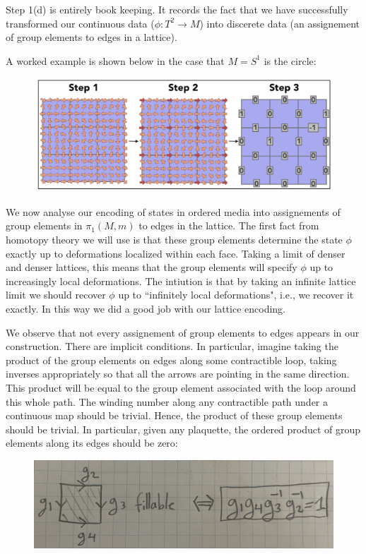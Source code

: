 \documentclass{article}
\theoremstyle{definition}
\newcommand{\0}{\left|0\right>}
\newcommand{\1}{\left|1\right>}
\numberwithin{figure}{section}
\begin{document}
Step 1(d) is entirely book keeping. It records the fact that we have successfully transformed our continuous data ($\phi:T^2\to M$) into discerete data (an assignement of group elements to edges in a lattice).

A worked example is shown below in the case that $M=S^1$ is the circle:

\begin{figure}[h]
\begin{center}
\includegraphics[scale=.3]{full-example}
\end{center}
\end{figure}

We now analyse our encoding of states in ordered media into assignements of group elements in $\pi_1(M,m)$ to edges in the lattice. The first fact from homotopy theory we will use is that these group elements determine the state $\phi$ exactly up to deformations localized within each face. Taking a limit of denser and denser lattices, this means that the group elements will specify $\phi$ up to increasingly local deformations. The intiution is that by taking an infinite lattice limit we should recover $\phi$ up to ``infinitely local deformations", i.e., we recover it exactly. In this way we did a good job with our lattice encoding.

We observe that not every assignement of group elements to edges appears in our construction. There are implicit conditions. In particular, imagine taking the product of the group elements on edges along some contractible loop, taking inverses appropriately so that all the arrows are pointing in the same direction. This product will be equal to the group element associated with the loop around this whole path. The winding number along any contractible path under a continuous map should be trivial. Hence, the product of these group elements should be trivial. In particular, given any plaquette, the ordered product of group elements along its edges should be zero:

\begin{figure}[h]
\begin{center}
\includegraphics[scale=.06]{plaquette-rule}
\end{center}
\end{figure}
\end{document}
